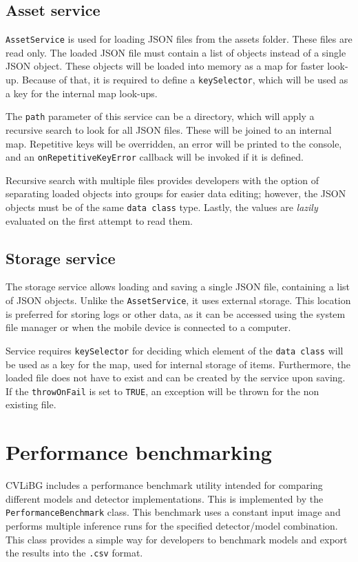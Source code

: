 \subsection{Asset service}
\label{AssetService}
\texttt{AssetService} is used for loading JSON files from the assets folder. These files are read only. The loaded JSON file must contain a list of objects instead of a single JSON object. These objects will be loaded into memory as a map for faster look-up. Because of that, it is required to define a \texttt{keySelector}, which will be used as a key for the internal map look-ups. 

The \texttt{path} parameter of this service can be a directory, which will apply a recursive search to look for all JSON files. These will be joined to an internal map. Repetitive keys will be overridden, an error will be printed to the console, and an \texttt{onRepetitiveKeyError} callback will be invoked if it is defined.

Recursive search with multiple files provides developers with the option of separating loaded objects into groups for easier data editing; however, the JSON objects must be of the same \texttt{data class} type. Lastly, the values are \textit{lazily} evaluated on the first attempt to read them.

\subsection{Storage service}
\label{StorageService}
The storage service allows loading and saving a single JSON file, containing a list of JSON objects. Unlike the \texttt{AssetService}, it uses external storage. This location is preferred for storing logs or other data, as it can be accessed using the system file manager or when the mobile device is connected to a computer. 

Service requires \texttt{keySelector} for deciding which element of the \texttt{data class} will be used as a key for the map, used for internal storage of items. Furthermore, the loaded file does not have to exist and can be created by the service upon saving. If the \texttt{throwOnFail} is set to \texttt{TRUE}, an exception will be thrown for the non existing file.


\section{Performance benchmarking}
CVLiBG includes a performance benchmark utility intended for comparing different models and detector implementations. This is implemented by the \texttt{PerformanceBenchmark} class. This benchmark uses a constant input image and performs multiple inference runs for the specified detector/model combination. This class provides a simple way for developers to benchmark models and export the results into the \texttt{.csv} format.

